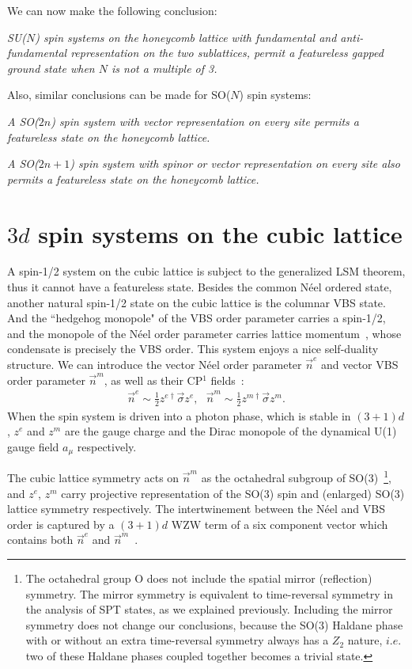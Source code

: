 \documentclass[aps,prb,twocolumn,superscriptaddress,showpacs]{revtex4}
\newcommand{\beqn}{\begin{eqnarray}}
\newcommand{\eeqn}{\end{eqnarray}}
\begin{document}
We can now make the following conclusion:

{\it SU($N$) spin systems on the honeycomb lattice with
fundamental and anti-fundamental representation on the two
sublattices, permit a featureless gapped ground state when $N$ is
not a multiple of 3.}

Also, similar conclusions can be made for SO($N$) spin systems:

{\it A SO($2n$) spin system with vector representation on every
site permits a featureless state on the honeycomb lattice. }

{\it A SO($2n+1$) spin system with spinor or vector representation
on every site also permits a featureless state on the honeycomb
lattice.}


\section{$3d$ spin systems on the cubic lattice}

A spin-1/2 system on the cubic lattice is subject to the
generalized LSM theorem, thus it cannot have a featureless state.
Besides the common N\'{e}el ordered state, another natural
spin-1/2 state on the cubic lattice is the columnar VBS state. And
the ``hedgehog monopole" of the VBS order parameter carries a
spin-1/2, and the monopole of the N\'{e}el order parameter carries
lattice momentum~\cite{senthilloop}, whose condensate is precisely
the VBS order. This system enjoys a nice self-duality structure.
We can introduce the vector N\'{e}el order parameter $\vec{n}^{e}$
and vector VBS order parameter $\vec{n}^{m}$, as well as their
CP$^1$ fields~\cite{senthilloop,chenbalents}: \beqn \vec{n}^{e}
\sim \frac{1}{2}z^{e \dagger}\vec{\sigma} z^e, \ \ \ \vec{n}^{m}
\sim \frac{1}{2}z^{m \dagger}\vec{\sigma} z^m. \eeqn When the spin
system is driven into a photon phase, which is stable in $(3+1)d$,
$z^e$ and $z^m$ are the gauge charge and the Dirac monopole of the
dynamical U(1) gauge field $a_\mu$ respectively.

The cubic lattice symmetry acts on $\vec{n}^{m}$ as the octahedral
subgroup of SO(3)~\footnote{The octahedral group O does not
include the spatial mirror (reflection) symmetry. The mirror
symmetry is equivalent to time-reversal symmetry in the analysis
of SPT states, as we explained previously. Including the mirror
symmetry does not change our conclusions, because the SO(3)
Haldane phase with or without an extra time-reversal symmetry
always has a $Z_2$ nature, $i.e.$ two of these Haldane phases
coupled together becomes a trivial state.}, and $z^e$, $z^m$ carry
projective representation of the SO(3) spin and (enlarged) SO(3)
lattice symmetry respectively. The intertwinement between the
N\'{e}el and VBS order is captured by a $(3+1)d$ WZW term of a six
component vector which contains both $\vec{n}^e$ and
$\vec{n}^m$~\cite{ryuwzw}.
\end{document}
